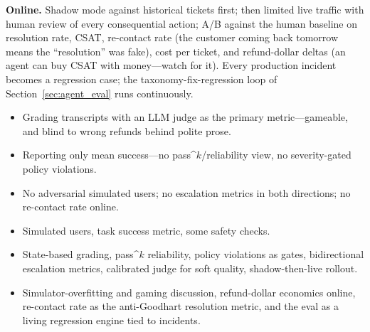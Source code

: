 \begin{interviewq}
\textbf{Online.} Shadow mode against historical tickets first; then limited live traffic with human review of every consequential action; A/B against the human baseline on resolution rate, CSAT, re-contact rate (the customer coming back tomorrow means the ``resolution'' was fake), cost per ticket, and refund-dollar deltas (an agent can buy CSAT with money---watch for it). Every production incident becomes a regression case; the taxonomy-fix-regression loop of Section~\ref{sec:agent_eval} runs continuously.

\redflags
\begin{itemize}
    \item Grading transcripts with an LLM judge as the primary metric---gameable, and blind to wrong refunds behind polite prose.
    \item Reporting only mean success---no pass\textasciicircum{}$k$/reliability view, no severity-gated policy violations.
    \item No adversarial simulated users; no escalation metrics in both directions; no re-contact rate online.
\end{itemize}


\goodgreat
\begin{itemize}
    \item {} Simulated users, task success metric, some safety checks.
    \item {} State-based grading, pass\textasciicircum{}$k$ reliability, policy violations as gates, bidirectional escalation metrics, calibrated judge for soft quality, shadow-then-live rollout.
    \item {} Simulator-overfitting and gaming discussion, refund-dollar economics online, re-contact rate as the anti-Goodhart resolution metric, and the eval as a living regression engine tied to incidents.
\end{itemize}

\end{interviewq}

